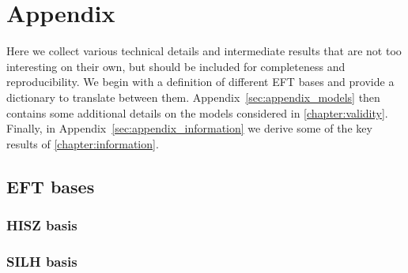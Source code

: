 
\chapter{Appendix}
\label{chapter:appendix}

Here we collect various technical details and intermediate results
that are not too interesting on their own, but should be included for
completeness and reproducibility. We begin with a definition of
different EFT bases and provide a dictionary to translate between
them. Appendix~\ref{sec:appendix_models} then contains some additional
details on the models considered in
\autoref{chapter:validity}. Finally, in
Appendix~\ref{sec:appendix_information} we derive some of the key
results of \autoref{chapter:information}.



\section{EFT bases}
\label{sec:appendix_bases}




\subsection{HISZ basis}
\label{sec:appendix_bases_HISZ}




\subsection{SILH basis}
\label{sec:appendix_bases_SILH}

